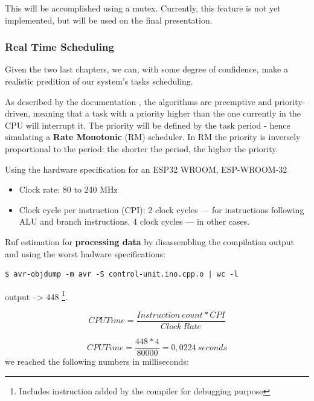 \documentclass[11pt]{article}
\begin{document}
This will be accomplished using a mutex. Currently, this feature is not yet implemented, but will be used on the final presentation.

\subsubsection{Real Time Scheduling}

Given the two last chapters, we can, with some degree of confidence, make a realistic predition of our system's tasks scheduling. 

As described by the documentation \cite{c1}, the algorithms are preemptive and priority- driven, meaning that a task with a priority higher than the one currently in the CPU will interrupt it. The priority will be defined by the task period - hence simulating a \textbf{Rate Monotonic} (RM) scheduler. In RM the priority is inversely proportional to the period: the shorter the period, the higher the priority. 

Using the hardware specification for an ESP32 WROOM, 
\newline
\newline
ESP-WROOM-32 \cite{c2} 
\begin{itemize}
	\item Clock rate: 80 to 240 MHz
	\item Clock cycle per instruction (CPI): 2 clock cycles — for instructions following ALU and branch instructions. 4 clock cycles — in other cases.
\end{itemize}

\noindent
Ruf estimation for \textbf{processing data} by disassembling the compilation output and using the worst hadware specifications:

\begin{verbatim}
$ avr-objdump -m avr -S control-unit.ino.cpp.o | wc -l
\end{verbatim}
output -->  448 \footnote{Includes instruction added by the compiler for debugging purpose}. 

\begin{equation} 
	CPU Time =  \frac{Instruction\ count * CPI}{Clock\ Rate}
\end{equation}

\begin{equation} 
	CPU Time =  \frac{448 * 4}{80 000} = 0,0224\ seconds
\end{equation}
\newline
\newline
we reached the following numbers in milliseconds:
\end{document}
